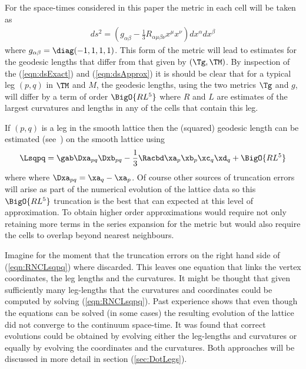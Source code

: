 \documentclass[a4paper,12pt]{article}
\numberwithin{equation}{section}
\begin{document}
For the space-times considered in this paper the metric in each cell will be taken as
\begin{align}
   \label{eqn:dsApprox}
	ds^2 = \left(g_{\alpha\beta}
	              - \frac{1}{3}R_{\alpha\mu\beta\nu} x^\mu x^\nu
			 \right) dx^\alpha dx^\beta
\end{align}
where $g_{\alpha\beta} = \diag (-1,1,1,1)$. This form of the metric will lead to estimates
for the geodesic lengths that differ from that given by $(\Tg,\TM)$. By inspection of the
(\ref{eqn:dsExact}) and (\ref{eqn:dsApprox}) it is should be clear that for a typical leg
$(p,q)$ in $\TM$ and $M$, the geodesic lengths, using the two metrics $\Tg$ and $g$, will
differ by a term of order $\BigO{RL^5}$ where $R$ and $L$ are estimates of the largest
curvatures and lengths in any of the cells that contain this leg.

If $(p,q)$ is a leg in the smooth lattice then the (squared) geodesic length can be
estimated (see~\cite{brewin:2009-03,synge:1960-01}) on the smooth lattice using
\begin{align}
   \Lsqpq = \gab \Dxa_{pq} \Dxb_{pq}
          - \frac{1}{3} \Racbd \xa_p \xb_p \xc_q \xd_q
          + \BigO{RL^5}
   \label{eqn:RNCLsqpq}
\end{align}
where where $\Dxa_{pq}=\xa_q-\xa_p$. Of course other sources of truncation errors will arise
as part of the numerical evolution of the lattice data so this $\BigO{RL^5}$ truncation is
the best that can expected at this level of approximation. To obtain higher order
approximations would require not only retaining more terms in the series expansion for the
metric but would also require the cells to overlap beyond nearest neighbours.

Imagine for the moment that the truncation errors on the right hand side of
(\ref{eqn:RNCLsqpq}) where discarded. This leaves one equation that links the vertex
coordinates, the leg lengths and the curvatures. It might be thought that given sufficiently
many leg-lengths that the curvatures and coordinates could be computed by solving
(\ref{eqn:RNCLsqpq}). Past experience shows that even though the equations can be solved (in
some cases) the resulting evolution of the lattice did not converge to the continuum
space-time. It was found that correct evolutions could be obtained by evolving either the
leg-lengths and curvatures or equally by evolving the coordinates and the curvatures. Both
approaches will be discussed in more detail in section (\ref{sec:DotLegs}).

\end{document}
